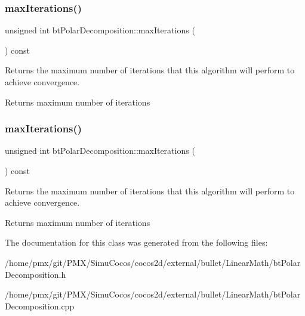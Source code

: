 \subsubsection{\texorpdfstring{max\+Iterations()}{maxIterations()}\hspace{0.1cm}{\footnotesize\ttfamily [1/2]}}
{\footnotesize\ttfamily unsigned int bt\+Polar\+Decomposition\+::max\+Iterations (\begin{DoxyParamCaption}{ }\end{DoxyParamCaption}) const}

Returns the maximum number of iterations that this algorithm will perform to achieve convergence.

\begin{DoxyReturn}{Returns}
maximum number of iterations 
\end{DoxyReturn}
\mbox{\label{classbtPolarDecomposition_ad463b266ff54e51c92d8c8786d4d843f}} 
\subsubsection{\texorpdfstring{max\+Iterations()}{maxIterations()}\hspace{0.1cm}{\footnotesize\ttfamily [2/2]}}
{\footnotesize\ttfamily unsigned int bt\+Polar\+Decomposition\+::max\+Iterations (\begin{DoxyParamCaption}{ }\end{DoxyParamCaption}) const}

Returns the maximum number of iterations that this algorithm will perform to achieve convergence.

\begin{DoxyReturn}{Returns}
maximum number of iterations 
\end{DoxyReturn}


The documentation for this class was generated from the following files\+:\begin{DoxyCompactItemize}
\item 
/home/pmx/git/\+P\+M\+X/\+Simu\+Cocos/cocos2d/external/bullet/\+Linear\+Math/bt\+Polar\+Decomposition.\+h\item 
/home/pmx/git/\+P\+M\+X/\+Simu\+Cocos/cocos2d/external/bullet/\+Linear\+Math/bt\+Polar\+Decomposition.\+cpp\end{DoxyCompactItemize}
